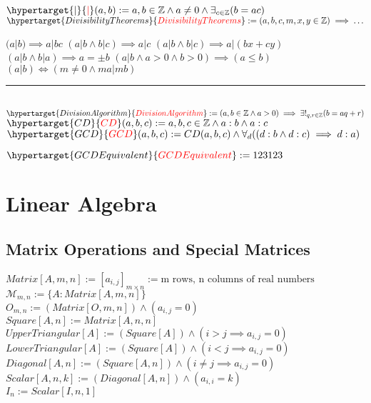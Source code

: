 \documentclass{book}
\newcommand{\df}[1]{\hypertarget{#1}{\textcolor{red}{#1}}}
\newcommand{\abr}{:=}
\begin{document}
$\df{|}(a, b) \abr a, b \in \mathbb{Z} \land a \neq 0 \land \exists_{c \in \mathbb{Z}}(b = a c)$ \\

$\df{Divisibility Theorems} \abr (a, b, c, m, x, y \in \mathbb{Z}) \implies \ldots$
\begin{enumerate}
  \lit $(a | b) \implies a | b c$
  \lit $(a | b \land b | c) \implies a | c$
  \lit $(a | b \land b | c) \implies a | (b x + c y)$
  \lit $(a | b \land b | a) \implies a = \pm b$
  \lit $(a | b \land a > 0 \land b > 0) \implies (a \leq b)$
  \lit $(a | b) \iff (m \neq 0 \land m a | m b)$
\end{enumerate} \vspace{.75mm} \hrule \vspace{.75mm} \ \\ 

$\df{Division Algorithm} \abr (a, b \in \mathbb{Z} \land a > 0) \implies \exists!_{q, r \in \mathbb{Z}}(b = a q + r)$ \\

$\df{CD}(a, b, c) \abr a, b, c \in \mathbb{Z} \land a : b \land a : c$ \\
$\df{GCD}(a, b, c) \abr CD(a, b, c) \land \forall_{d}((d : b \land d : c) \implies d : a)$

$\df{GCD Equivalent} \abr 123123$

\chapter{Linear Algebra} %

\section{Matrix Operations and Special Matrices}
$Matrix[A, m, n] \abr [a_{i, j}]_{m \times n} \abr \text{m rows, n columns of real numbers}$ \\
$\mathcal{M}_{m, n} \abr \{A : Matrix[A, m, n]\}$ \\
$O_{m, n} \abr (Matrix[O, m, n]) \land (a_{i, j} = 0)$ \\
$Square[A, n] \abr Matrix[A, n, n]$ \\
$UpperTriangular[A] \abr (Square[A]) \land (i > j \implies a_{i, j} = 0)$ \\
$LowerTriangular[A] \abr (Square[A]) \land (i < j \implies a_{i, j} = 0)$ \\
$Diagonal[A, n] \abr (Square[A, n]) \land (i \neq j \implies a_{i, j} = 0)$ \\
$Scalar[A, n, k] \abr (Diagonal[A, n]) \land (a_{i, i} = k)$ \\
$I_n \abr Scalar[I, n, 1]$ \\
\end{document}
